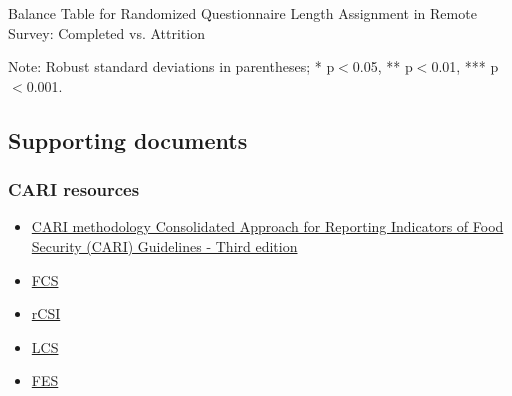 \documentclass[11pt,harvard]{article}
\begin{document}
	\begin{table}[htbp]
		\centering
		\begin{adjustbox}{max width=\textwidth}
			\begin{threeparttable}
				\caption{Balance Table for Randomized Questionnaire Length Assignment in Remote Survey: Completed vs. Attrition}
				\small
				 
				\label{tab:BF_Listing_Demo_Attrition_Remote}
				\begin{tablenotes}
					\item Note: Robust standard deviations in parentheses; * p$<$0.05, ** p$<$0.01, *** p$<$0.001.
				\end{tablenotes}
			\end{threeparttable}
		\end{adjustbox}
	\end{table}
	
	\pagebreak
	
	\pagebreak
	
	\subsection{Supporting documents}
	\subsubsection{CARI resources}
	\begin{itemize}
		\item \href{https://resources.vam.wfp.org/data-analysis/quantitative/food-security/cari}{CARI methodology Consolidated Approach for Reporting Indicators of Food Security (CARI) Guidelines - Third edition}
		\item \href{https://resources.vam.wfp.org/data-analysis/quantitative/food-security/food-consumption-score}{FCS}
		\item \href{https://resources.vam.wfp.org/data-analysis/quantitative/food-security/reduced-coping-strategies-index}{rCSI}
		\item \href{https://resources.vam.wfp.org/data-analysis/quantitative/food-security/livelihood-coping-strategies-food-security}{LCS}
		\item \href{https://resources.vam.wfp.org/data-analysis/quantitative/food-security/food-expenditure-share}{FES}
	\end{itemize} 
	
\end{document}
